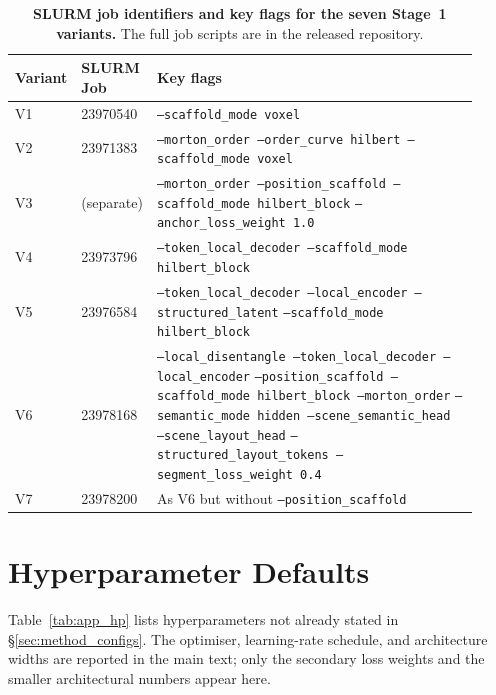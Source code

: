 \begin{table}[t]
  \centering
  \caption[Per-variant SLURM job ids and flags]{\textbf{SLURM job identifiers and key flags for the seven Stage~1 variants.} The full job scripts are in the released repository.}
  \label{tab:app_flags}
  {\footnotesize
  \begin{tabular}{p{0.06\linewidth}p{0.10\linewidth}p{0.76\linewidth}}
    \toprule
    Variant & SLURM Job & Key flags \\
    \midrule
    V1 & 23970540 &
      \texttt{--scaffold\_mode voxel} \\[4pt]
    V2 & 23971383 &
      \texttt{--morton\_order --order\_curve hilbert --scaffold\_mode voxel} \\[4pt]
    V3 & (separate) &
      \texttt{--morton\_order --position\_scaffold --scaffold\_mode hilbert\_block}
      \texttt{--anchor\_loss\_weight 1.0} \\[4pt]
    V4 & 23973796 &
      \texttt{--token\_local\_decoder --scaffold\_mode hilbert\_block} \\[4pt]
    V5 & 23976584 &
      \texttt{--token\_local\_decoder --local\_encoder --structured\_latent}
      \texttt{--scaffold\_mode hilbert\_block} \\[4pt]
    V6 & 23978168 &
      \texttt{--local\_disentangle --token\_local\_decoder --local\_encoder}
      \texttt{--position\_scaffold --scaffold\_mode hilbert\_block --morton\_order}
      \texttt{--semantic\_mode hidden --scene\_semantic\_head --scene\_layout\_head}
      \texttt{--structured\_layout\_tokens --segment\_loss\_weight 0.4} \\[4pt]
    V7 & 23978200 &
      As V6 but without \texttt{--position\_scaffold} \\
    \bottomrule
  \end{tabular}}
\end{table}

\section{Hyperparameter Defaults}
\label{app:hparams}

Table~\ref{tab:app_hp} lists hyperparameters not already stated in \S\ref{sec:method_configs}. The optimiser, learning-rate schedule, and architecture widths are reported in the main text; only the secondary loss weights and the smaller architectural numbers appear here.

